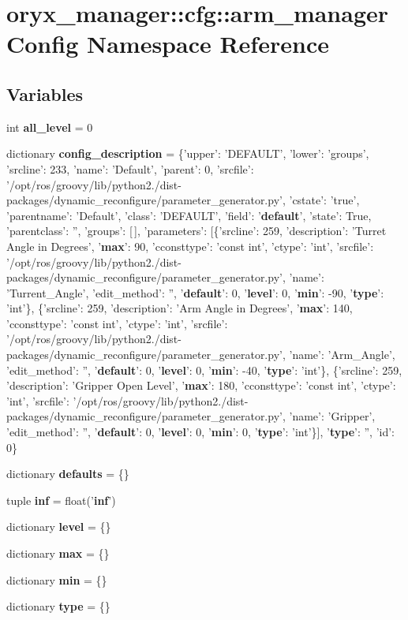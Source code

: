 \section{oryx\-\_\-manager\-:\-:cfg\-:\-:arm\-\_\-manager\-Config \-Namespace \-Reference}
\label{namespaceoryx__manager_1_1cfg_1_1arm__managerConfig}
\subsection*{\-Variables}
\begin{DoxyCompactItemize}
\item 
int {\bf all\-\_\-level} = 0
\item 
dictionary {\bf config\-\_\-description} = \{'upper'\-: '\-D\-E\-F\-A\-U\-L\-T', 'lower'\-: 'groups', 'srcline'\-: 233, 'name'\-: '\-Default', 'parent'\-: 0, 'srcfile'\-: '/opt/ros/groovy/lib/python2./dist-\/packages/dynamic\-\_\-reconfigure/parameter\-\_\-generator.\-py', 'cstate'\-: 'true', 'parentname'\-: '\-Default', 'class'\-: '\-D\-E\-F\-A\-U\-L\-T', 'field'\-: '{\bf default}', 'state'\-: \-True, 'parentclass'\-: '', 'groups'\-: [$\,$], 'parameters'\-: [\{'srcline'\-: 259, 'description'\-: '\-Turret \-Angle in \-Degrees', '{\bf max}'\-: 90, 'cconsttype'\-: 'const int', 'ctype'\-: 'int', 'srcfile'\-: '/opt/ros/groovy/lib/python2./dist-\/packages/dynamic\-\_\-reconfigure/parameter\-\_\-generator.\-py', 'name'\-: '\-Turrent\-\_\-\-Angle', 'edit\-\_\-method'\-: '', '{\bf default}'\-: 0, '{\bf level}'\-: 0, '{\bf min}'\-: -\/90, '{\bf type}'\-: 'int'\}, \{'srcline'\-: 259, 'description'\-: '\-Arm \-Angle in \-Degrees', '{\bf max}'\-: 140, 'cconsttype'\-: 'const int', 'ctype'\-: 'int', 'srcfile'\-: '/opt/ros/groovy/lib/python2./dist-\/packages/dynamic\-\_\-reconfigure/parameter\-\_\-generator.\-py', 'name'\-: '\-Arm\-\_\-\-Angle', 'edit\-\_\-method'\-: '', '{\bf default}'\-: 0, '{\bf level}'\-: 0, '{\bf min}'\-: -\/40, '{\bf type}'\-: 'int'\}, \{'srcline'\-: 259, 'description'\-: '\-Gripper \-Open \-Level', '{\bf max}'\-: 180, 'cconsttype'\-: 'const int', 'ctype'\-: 'int', 'srcfile'\-: '/opt/ros/groovy/lib/python2./dist-\/packages/dynamic\-\_\-reconfigure/parameter\-\_\-generator.\-py', 'name'\-: '\-Gripper', 'edit\-\_\-method'\-: '', '{\bf default}'\-: 0, '{\bf level}'\-: 0, '{\bf min}'\-: 0, '{\bf type}'\-: 'int'\}], '{\bf type}'\-: '', 'id'\-: 0\}
\item 
dictionary {\bf defaults} = \{\}
\item 
tuple {\bf inf} = float('{\bf inf}')
\item 
dictionary {\bf level} = \{\}
\item 
dictionary {\bf max} = \{\}
\item 
dictionary {\bf min} = \{\}
\item 
dictionary {\bf type} = \{\}
\end{DoxyCompactItemize}


